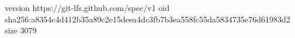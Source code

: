 version https://git-lfs.github.com/spec/v1
oid sha256:a8354c4d412b35a89c2e15deea4dc3fb7b3ea558fc55da5834735e76d61983d2
size 3079
